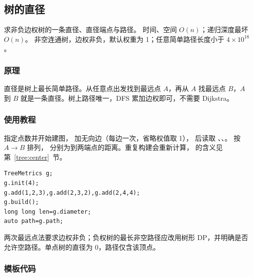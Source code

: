 \subsection{树的直径}
\label{tree:diameter}
\AlgorithmInfo
    {求非负边权树的一条直径、直径端点与路径。}
    {时间、空间 $O(n)$；递归深度最坏 $O(n)$。}
    {非空连通树，边权非负，默认权重为 1；任意简单路径长度小于 $4\times10^{18}$。}
\subsubsection*{原理}
直径是树上最长简单路径。从任意点出发找到最远点 $A$，再从 $A$ 找最远点 $B$，$A$ 到 $B$ 就是一条直径。树上路径唯一，DFS 累加边权即可，不需要 Dijkstra。

\subsubsection*{使用教程}
 指定点数并开始建图， 加无向边（每边一次，省略权值取 1）， 后读取 、、。 按 $A\to B$ 排列， 分别为到两端点的距离。重复构建会重新计算， 的含义见第~\ref{tree:center}~节。
\begin{lstlisting}[style=mtycpp,numbers=none]
TreeMetrics g;
g.init(4);
g.add(1,2,3),g.add(2,3,2),g.add(2,4,4);
g.build();
long long len=g.diameter;
auto path=g.path;
\end{lstlisting}
两次最远点法要求边权非负；负权树的最长非空路径应改用树形 DP，并明确是否允许空路径。单点树的直径为 0，路径仅含该顶点。
\subsubsection*{模板代码}
